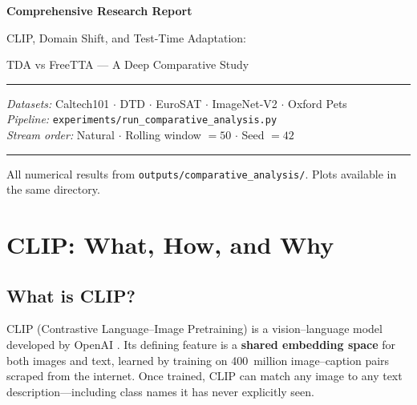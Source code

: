 \documentclass[12pt,a4paper]{article}
\newcommand{\1}{\mathbf{1}}
\begin{document}
\begin{titlepage}
  \centering
  \vspace*{2cm}
  {\LARGE\bfseries Comprehensive Research Report\par}
  \vspace{0.5cm}
  {\Large CLIP, Domain Shift, and Test-Time Adaptation:\par}
  {\Large TDA vs FreeTTA --- A Deep Comparative Study\par}
  \vspace{1cm}
  \rule{0.7\textwidth}{0.4pt}
  \vspace{0.5cm}

  {\normalsize
  \textit{Datasets:} Caltech101 $\cdot$ DTD $\cdot$ EuroSAT $\cdot$ ImageNet-V2 $\cdot$ Oxford Pets\\[4pt]
  \textit{Pipeline:} \texttt{experiments/run\_comparative\_analysis.py}\\[4pt]
  \textit{Stream order:} Natural $\cdot$ Rolling window $= 50$ $\cdot$ Seed $= 42$
  }

  \vspace{1cm}
  \rule{0.7\textwidth}{0.4pt}
  \vspace{2cm}

  {\small All numerical results from \texttt{outputs/comparative\_analysis/}.
  Plots available in the same directory.}
\end{titlepage}

\tableofcontents
\clearpage

\section{CLIP: What, How, and Why}

\subsection{What is CLIP?}

CLIP (Contrastive Language--Image Pretraining) is a vision--language model developed by OpenAI \cite{radford2021clip}.
Its defining feature is a \textbf{shared embedding space} for both images and text, learned by training on 400~million image--caption pairs scraped from the internet.
Once trained, CLIP can match any image to any text description---including class names it has never explicitly seen.
\end{document}
